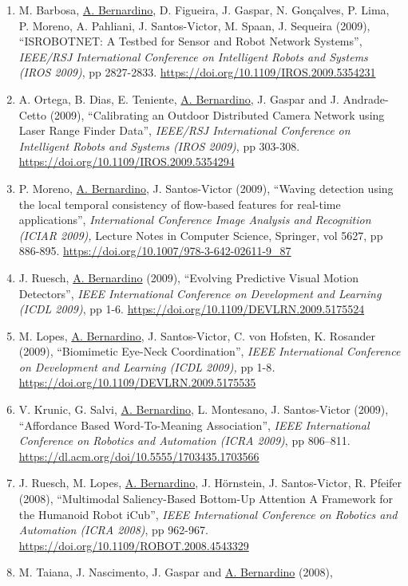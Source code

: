 \documentclass[
]{article}
\begin{document}
\begin{enumerate}
\item
  M. Barbosa, \ul{A. Bernardino}, D. Figueira, J. Gaspar, N. Gonçalves,
  P. Lima, P. Moreno, A. Pahliani, J. Santos-Victor, M. Spaan, J.
  Sequeira (2009), ``ISROBOTNET: A Testbed for Sensor and Robot Network
  Systems'', \emph{IEEE/RSJ International Conference on Intelligent
  Robots and Systems (IROS 2009)}, pp 2827-2833.
  \url{https://doi.org/10.1109/IROS.2009.5354231}~
\item
  A. Ortega, B. Dias, E. Teniente, \ul{A. Bernardino}, J. Gaspar and J.
  Andrade-Cetto (2009), ``Calibrating an Outdoor Distributed Camera
  Network using Laser Range Finder Data'', \emph{IEEE/RSJ International
  Conference on Intelligent Robots and Systems (IROS 2009)}, pp 303-308.
  \url{https://doi.org/10.1109/IROS.2009.5354294}~
\item
  P. Moreno, \ul{A. Bernardino}, J. Santos-Victor (2009), ``Waving
  detection using the local temporal consistency of flow-based features
  for real-time applications'', \emph{International Conference Image
  Analysis and Recognition (ICIAR 2009),} Lecture Notes in Computer
  Science, Springer, vol 5627, pp 886-895.
  \url{https://doi.org/10.1007/978-3-642-02611-9_87}~
\item
  J. Ruesch, \ul{A. Bernardino} (2009), ``Evolving Predictive Visual
  Motion Detectors'', \emph{IEEE International Conference on Development
  and Learning (ICDL 2009)}, pp 1-6.
  \url{https://doi.org/10.1109/DEVLRN.2009.5175524}
\item
  M. Lopes, \ul{A. Bernardino}, J. Santos-Victor, C. von Hofsten, K.
  Rosander (2009), ``Biomimetic Eye-Neck Coordination'', \emph{IEEE
  International Conference on Development and Learning (ICDL 2009),} pp
  1-8\emph{.} \url{https://doi.org/10.1109/DEVLRN.2009.5175535} ~
\item
  V. Krunic, G. Salvi, \ul{A. Bernardino}, L. Montesano, J.
  Santos-Victor (2009), ``Affordance Based Word-To-Meaning
  Association'', \emph{IEEE International Conference on Robotics and
  Automation (ICRA 2009)}, pp 806--811.
  \url{https://dl.acm.org/doi/10.5555/1703435.1703566}~
\item
  J. Ruesch, M. Lopes, \ul{A. Bernardino}, J. Hörnstein, J.
  Santos-Victor, R. Pfeifer (2008), ``Multimodal Saliency-Based
  Bottom-Up Attention A Framework for the Humanoid Robot iCub'',
  \emph{IEEE International Conference on Robotics and Automation (ICRA
  2008)}, pp 962-967. \url{https://doi.org/10.1109/ROBOT.2008.4543329}~
\item
  M. Taiana, J. Nascimento, J. Gaspar and \ul{A. Bernardino} (2008),

\end{enumerate}
\end{document}
